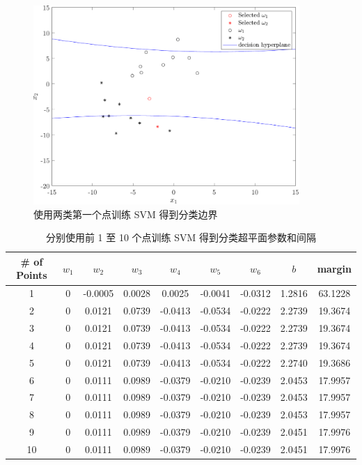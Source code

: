 \documentclass[openany]{ctexbook}
\theoremstyle{kaiti}
\theoremstyle{normal}
\begin{document}
\begin{figure}[htbp]
  \centering
  \includegraphics[width=0.9\textwidth]{svmPoint1.pdf}
  \caption{使用两类第一个点训练 SVM 得到分类边界}
  \label{fig:svm1}
\end{figure}

\begin{table}[htbp]
  \centering
  \caption{分别使用前 1 至 10 个点训练 SVM 得到分类超平面参数和间隔}
  \label{tab:svm}
  \begin{tabular}{ccccccccc}
    \hline
    \# of Points & $w_1$ & $w_2$   & $w_3$  & $w_4$   & $w_5$   & $w_6$   & $b$    & margin  \\
    \hline
    1   & 0     & -0.0005 & 0.0028 & 0.0025  & -0.0041 & -0.0312 & 1.2816 & 63.1228 \\
    2   & 0     & 0.0121  & 0.0739 & -0.0413 & -0.0534 & -0.0222 & 2.2739 & 19.3674 \\
    3   & 0     & 0.0121  & 0.0739 & -0.0413 & -0.0534 & -0.0222 & 2.2739 & 19.3674 \\
    4   & 0     & 0.0121  & 0.0739 & -0.0413 & -0.0534 & -0.0222 & 2.2739 & 19.3674 \\
    5   & 0     & 0.0121  & 0.0739 & -0.0413 & -0.0534 & -0.0222 & 2.2740 & 19.3686 \\
    6   & 0     & 0.0111  & 0.0989 & -0.0379 & -0.0210 & -0.0239 & 2.0453 & 17.9957 \\
    7   & 0     & 0.0111  & 0.0989 & -0.0379 & -0.0210 & -0.0239 & 2.0453 & 17.9957 \\
    8   & 0     & 0.0111  & 0.0989 & -0.0379 & -0.0210 & -0.0239 & 2.0453 & 17.9957 \\
    9   & 0     & 0.0111  & 0.0989 & -0.0379 & -0.0210 & -0.0239 & 2.0451 & 17.9976 \\
    10  & 0     & 0.0111  & 0.0989 & -0.0379 & -0.0210 & -0.0239 & 2.0451 & 17.9976\\
    \hline
  \end{tabular}
\end{table}
\end{document}
